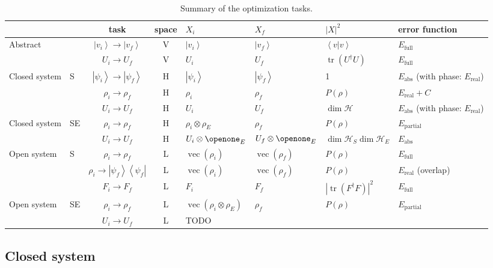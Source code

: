 \documentclass[aps, pra, a4paper, longbibliography, superscriptaddress]{revtex4-1}
\newcommand{\I}{\openone}
\newcommand{\ket}[1]{\left| #1 \right \rangle}
\newcommand{\braket}[2]{\left \langle #1 | #2 \right \rangle}
\newcommand{\ketbra}[2]{\left| #1 \right \rangle \left \langle #2 \right|}
\newcommand{\hilb}[1]{\mathcal{#1}}
\DeclareMathOperator{\tr}{tr}
\DeclareMathOperator{\cvec}{vec}
\begin{document}
\begin{table}
\begin{tabular}{ll|c|c|l|l|l|l}
& & task & space & $X_i$ & $X_f$ & $|X|^2$ & error function\\
\hline
Abstract &
& $\ket{v_i} \to \ket{v_f}$ & V
& $\ket{v_i}$ &$\ket{v_f}$ & $\braket{v}{v}$ & $E_\text{full}$\\
& & $U_i \to U_f$ & V
& $U_i$ & $U_f$ & $\tr(U^\dagger U)$ & $E_\text{full}$\\
\hline
Closed system & S
& $\ket{\psi_i} \to \ket{\psi_f}$ & H
& $\ket{\psi_i}$ & $\ket{\psi_f}$ & 1 & $E_\text{abs}$ (with phase: $E_\text{real}$)\\
& & $\rho_i \to \rho_f$ & H
& $\rho_i$ & $\rho_f$ & $P(\rho)$ & $E_\text{real} + C$\\
& & $U_i \to U_f$ & H
& $U_i$ & $U_f$ & $\dim \hilb{H}$ & $E_\text{abs}$ (with phase: $E_\text{real}$)\\
\hline
Closed system & SE
& $\rho_i \to \rho_f$ & H
& $\rho_i \otimes \rho_E$ & $\rho_f$ & $P(\rho)$ & $E_\text{partial}$\\
& & $U_i \to U_f$ & H
& $U_i \otimes \I_E$ & $U_f \otimes \I_E$ & $\dim \hilb{H}_S \dim \hilb{H}_E$ & $E_\text{abs}$\\
\hline
Open system & S
& $\rho_i \to \rho_f$ & L & $\cvec(\rho_i)$ & $\cvec(\rho_f)$ & $P(\rho)$ & $E_\text{full}$\\
& & $\rho_i \to \ketbra{\psi_f}{\psi_f}$ & L
& $\cvec(\rho_i)$ & $\cvec(\rho_f)$ & $P(\rho)$ & $E_\text{real}$ (overlap)\\
& & $F_i \to F_f$ & L & $F_i$ & $F_f$ & $|\tr(F^\dagger F)|^2$ & $E_\text{full}$\\
\hline
Open system & SE
& $\rho_i \to \rho_f$ & L
& $\cvec(\rho_i \otimes \rho_E)$ & $\rho_f$ & $P(\rho)$ & $E_\text{partial}$\\
& & $U_i \to U_f$ & L & TODO
\end{tabular}
\caption{Summary of the optimization tasks.
\label{table:tasks}
}
\end{table}


\subsection{Closed system}
\end{document}
